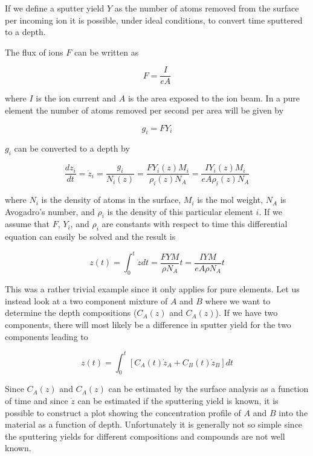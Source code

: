 If we define a sputter yield $Y$ as the number of atoms removed from the surface per incoming ion it is possible, under ideal conditions, to convert time sputtered to a depth.

The flux of ions $F$ can be written as
 
\begin{equation}
F=\frac{I}{eA}
\end{equation}

\noindent where $I$ is the ion current and $A$ is the area exposed to the ion beam. In a pure element the number of atoms removed per second per area will be given by

\begin{equation}
g_i=FY_i
\end{equation}

$g_i$ can be converted to a depth by

\begin{equation}
\frac{dz_i}{dt}=\dot{z}_i=\frac{g_i}{N_i(z)}=\frac{FY_i(z)M_i}{\rho_i(z)N_A}=\frac{IY_i(z)M_i}{eA\rho_i(z)N_A}
\end{equation}

\noindent where $N_i$ is the density of atoms in the surface, $M_i$ is the mol weight, $N_A$ is Avogadro's number, and $\rho_i$ is the density of this particular element $i$. If we assume that $F$, $Y_i$, and $\rho_i$ are constants with respect to time this differential equation can easily be solved and the result is

\begin{equation}\label{eq:sputterdepth}
z(t)=\int_0^t\dot{z}dt=\frac{FYM}{\rho N_A}t=\frac{IYM}{eA\rho N_A}t
\end{equation}

This was a rather trivial example since it only applies for pure elements. Let us instead look at a two component mixture of $A$ and $B$ where we want to determine the depth compositions ($C_A(z)$ and $C_A(z)$). If we have two components, there will most likely be a difference in sputter yield for the two components leading to

\begin{equation}
z(t)=\int_0^t[C_A(t)\dot{z}_A+C_B(t)\dot{z}_B]dt 
\end{equation}

Since $C_A(z)$ and $C_A(z)$ can be estimated by the surface analysis as a function of time and since $\dot{z}$ can be estimated if the sputtering yield is known, it is possible to construct a plot showing the concentration profile of $A$ and $B$ into the material as a function of depth. Unfortunately it is generally not so simple since the sputtering yields for different compositions and compounds are not well known.

